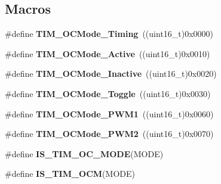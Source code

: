\subsection*{Macros}
\begin{DoxyCompactItemize}
\item 
\mbox{\label{group___t_i_m___output___compare__and___p_w_m__modes_ga54d5745fade3b2f8ea1325e7447ca760}} 
\#define {\bfseries T\+I\+M\+\_\+\+O\+C\+Mode\+\_\+\+Timing}~((uint16\+\_\+t)0x0000)
\item 
\mbox{\label{group___t_i_m___output___compare__and___p_w_m__modes_ga76bac57d41dc67218772f9c745c77102}} 
\#define {\bfseries T\+I\+M\+\_\+\+O\+C\+Mode\+\_\+\+Active}~((uint16\+\_\+t)0x0010)
\item 
\mbox{\label{group___t_i_m___output___compare__and___p_w_m__modes_gae0c350d7adaea14a37cabc2ab762695f}} 
\#define {\bfseries T\+I\+M\+\_\+\+O\+C\+Mode\+\_\+\+Inactive}~((uint16\+\_\+t)0x0020)
\item 
\mbox{\label{group___t_i_m___output___compare__and___p_w_m__modes_ga8b8adb6e81fe88bd14d44430f7f97021}} 
\#define {\bfseries T\+I\+M\+\_\+\+O\+C\+Mode\+\_\+\+Toggle}~((uint16\+\_\+t)0x0030)
\item 
\mbox{\label{group___t_i_m___output___compare__and___p_w_m__modes_gaefbe32dddc9630fbcc48b302b50d15fc}} 
\#define {\bfseries T\+I\+M\+\_\+\+O\+C\+Mode\+\_\+\+P\+W\+M1}~((uint16\+\_\+t)0x0060)
\item 
\mbox{\label{group___t_i_m___output___compare__and___p_w_m__modes_ga722d8f33a795ef82ed7ae76dfbb7613d}} 
\#define {\bfseries T\+I\+M\+\_\+\+O\+C\+Mode\+\_\+\+P\+W\+M2}~((uint16\+\_\+t)0x0070)
\item 
\#define {\bfseries I\+S\+\_\+\+T\+I\+M\+\_\+\+O\+C\+\_\+\+M\+O\+DE}(M\+O\+DE)
\item 
\#define {\bfseries I\+S\+\_\+\+T\+I\+M\+\_\+\+O\+CM}(M\+O\+DE)
\end{DoxyCompactItemize}


